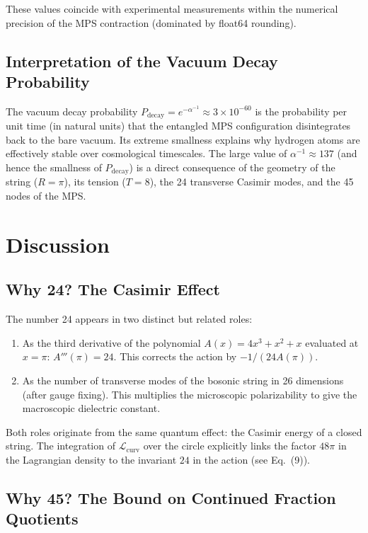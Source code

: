 \documentclass[12pt]{article}
\begin{document}
These values coincide with experimental measurements within the numerical precision of the MPS contraction (dominated by float64 rounding).

\subsection{Interpretation of the Vacuum Decay Probability}

The vacuum decay probability \(P_{\text{decay}} = e^{-\alpha^{-1}} \approx 3 \times 10^{-60}\) is the probability per unit time (in natural units) that the entangled MPS configuration disintegrates back to the bare vacuum. Its extreme smallness explains why hydrogen atoms are effectively stable over cosmological timescales. The large value of \(\alpha^{-1} \approx 137\) (and hence the smallness of \(P_{\text{decay}}\)) is a direct consequence of the geometry of the string (\(R = \pi\)), its tension (\(T = 8\)), the 24 transverse Casimir modes, and the 45 nodes of the MPS.

\section{Discussion}

\subsection{Why 24? The Casimir Effect}

The number 24 appears in two distinct but related roles:
\begin{enumerate}
    \item As the third derivative of the polynomial \(A(x)=4x^3+x^2+x\) evaluated at \(x=\pi\): \(A'''(\pi)=24\). This corrects the action by \(-1/(24A(\pi))\).
    \item As the number of transverse modes of the bosonic string in 26 dimensions (after gauge fixing). This multiplies the microscopic polarizability to give the macroscopic dielectric constant.
\end{enumerate}
Both roles originate from the same quantum effect: the Casimir energy of a closed string. The integration of \(\mathcal{L}_{\text{curv}}\) over the circle explicitly links the factor \(48\pi\) in the Lagrangian density to the invariant \(24\) in the action (see Eq.~(9)).

\subsection{Why 45? The Bound on Continued Fraction Quotients}
\end{document}
